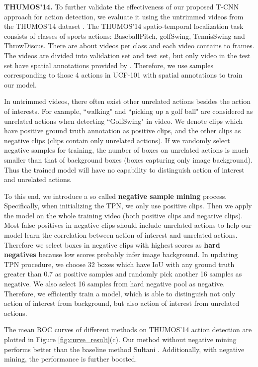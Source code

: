 \documentclass[10pt,twocolumn,letterpaper]{article}
\begin{document}
\textbf{THUMOS'14.}  To further validate the effectiveness of our proposed T-CNN approach for action detection, we evaluate it using the untrimmed videos from the THUMOS'14 dataset \cite{THUMOS14}. The THUMOS'14 spatio-temporal localization task consists of  classes of sports actions: BaseballPitch, golfSwing, TennisSwing and ThrowDiscus. There are about  videos per class and each video contains  to  frames. The videos are divided into validation set and test set, but only video in the test set have spatial annotations provided by \cite{Sultani_2016_CVPR}. Therefore, we use samples corresponding to those 4 actions in UCF-101 with spatial annotations to train our model.

In untrimmed videos, there often exist other unrelated actions besides the action of interests. For example, ``walking" and ``picking up a golf ball" are considered as unrelated actions when detecting ``GolfSwing" in video. We denote clips which have positive ground truth annotation as positive clips, and the other clips as negative clips (\ie clips contain only unrelated actions). If we randomly select negative samples for training, the number of boxes on unrelated actions is much smaller than that of background boxes (\ie boxes capturing only image background). Thus the trained model will have no capability to distinguish action of interest and unrelated actions.

To this end, we introduce a so called \textbf{negative sample mining} process. Specifically, when initializing the TPN, we only use positive clips. Then we apply the model on the whole training video (both positive clips and negative clips). Most false positives in negative clips should include unrelated actions to help our model learn the correlation between action of interest and unrelated actions. Therefore we select boxes in negative clips with highest scores as \textbf{hard negatives} because low scores probably infer image background. In updating TPN procedure, we choose 32 boxes which have IoU with any ground truth greater than 0.7 as positive samples and randomly pick another 16 samples as negative. We also select 16 samples from hard negative pool as negative. Therefore, we efficiently train a model, which is able to distinguish not only action of interest from background, but also action of interest from unrelated actions.

The mean ROC curves of different methods on THUMOS'14 action detection are plotted in Figure \ref{fig:curve_result}(c). Our method without negative mining performs better than the baseline method Sultani \etal \cite{Sultani_2016_CVPR}. Additionally, with negative mining, the performance is further boosted.
\end{document}
